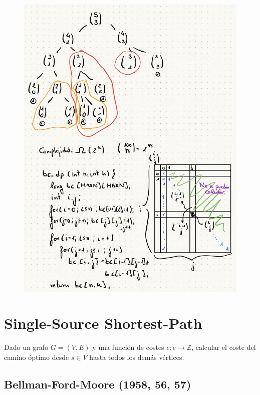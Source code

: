 \documentclass[12pt, twoside, openright]{report} %
\begin{document}
\begin{figure}[H]
	{\includegraphics[scale=.32]{Untitled 24.png}}
\end{figure}
\pagebreak
\section{Single-Source Shortest-Path}

  
Dado un grafo \(G=(V,E)\) y una función de costes \(c: e → \mathbb{Z}\),
calcular el coste del camino óptimo desde \(s \in V\) hasta todos los
demás vértices.

\subsection{Bellman-Ford-Moore (1958, 56, 57)}
\end{document}
